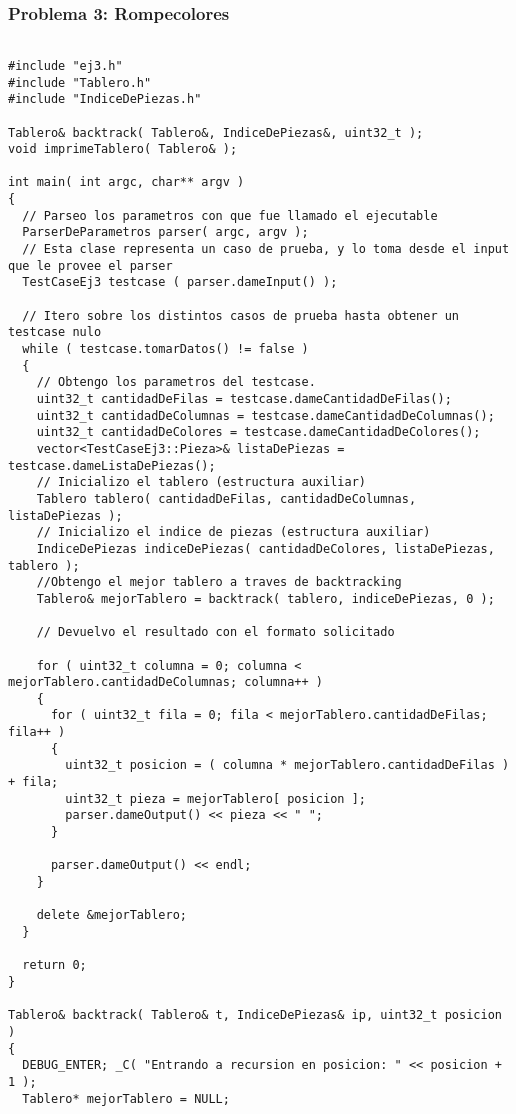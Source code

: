 \documentclass[11pt, a4paper, twoside]{article}
\begin{document}
{}
\subsubsection{Problema 3: Rompecolores }
\begin{lstlisting}

#include "ej3.h"
#include "Tablero.h"
#include "IndiceDePiezas.h"

Tablero& backtrack( Tablero&, IndiceDePiezas&, uint32_t );
void imprimeTablero( Tablero& );

int main( int argc, char** argv )
{
  // Parseo los parametros con que fue llamado el ejecutable
  ParserDeParametros parser( argc, argv );
  // Esta clase representa un caso de prueba, y lo toma desde el input que le provee el parser
  TestCaseEj3 testcase ( parser.dameInput() );

  // Itero sobre los distintos casos de prueba hasta obtener un testcase nulo
  while ( testcase.tomarDatos() != false )
  {
    // Obtengo los parametros del testcase.
    uint32_t cantidadDeFilas = testcase.dameCantidadDeFilas();
    uint32_t cantidadDeColumnas = testcase.dameCantidadDeColumnas();
    uint32_t cantidadDeColores = testcase.dameCantidadDeColores();
    vector<TestCaseEj3::Pieza>& listaDePiezas = testcase.dameListaDePiezas();
    // Inicializo el tablero (estructura auxiliar)
    Tablero tablero( cantidadDeFilas, cantidadDeColumnas, listaDePiezas );
    // Inicializo el indice de piezas (estructura auxiliar)
    IndiceDePiezas indiceDePiezas( cantidadDeColores, listaDePiezas, tablero );
    //Obtengo el mejor tablero a traves de backtracking
    Tablero& mejorTablero = backtrack( tablero, indiceDePiezas, 0 );

    // Devuelvo el resultado con el formato solicitado

    for ( uint32_t columna = 0; columna < mejorTablero.cantidadDeColumnas; columna++ )
    {
      for ( uint32_t fila = 0; fila < mejorTablero.cantidadDeFilas; fila++ )
      {
        uint32_t posicion = ( columna * mejorTablero.cantidadDeFilas ) + fila;
        uint32_t pieza = mejorTablero[ posicion ];
        parser.dameOutput() << pieza << " ";
      }

      parser.dameOutput() << endl;
    }

    delete &mejorTablero;
  }

  return 0;
}

Tablero& backtrack( Tablero& t, IndiceDePiezas& ip, uint32_t posicion )
{
  DEBUG_ENTER; _C( "Entrando a recursion en posicion: " << posicion + 1 );
  Tablero* mejorTablero = NULL;


\end{lstlisting}
\end{document}
